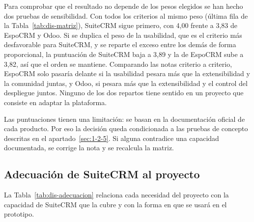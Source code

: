 Para comprobar que el resultado no depende de los pesos elegidos se han hecho dos pruebas de sensibilidad. Con todos los criterios al mismo peso (última fila de la Tabla~\ref{tab:dis-matriz}), SuiteCRM sigue primero, con 4,00 frente a 3,83 de EspoCRM y Odoo. Si se duplica el peso de la usabilidad, que es el criterio más desfavorable para SuiteCRM, y se reparte el exceso entre los demás de forma proporcional, la puntuación de SuiteCRM baja a 3,89 y la de EspoCRM sube a 3,82, así que el orden se mantiene. Comparando las notas criterio a criterio, EspoCRM solo pasaría delante si la usabilidad pesara más que la extensibilidad y la comunidad juntas, y Odoo, si pesara más que la extensibilidad y el control del despliegue juntos. Ninguno de los dos repartos tiene sentido en un proyecto que consiste en adaptar la plataforma.

Las puntuaciones tienen una limitación: se basan en la documentación oficial de cada producto. Por eso la decisión queda condicionada a las pruebas de concepto descritas en el apartado~\ref{sec:1-2-5}. Si alguna contradice una capacidad documentada, se corrige la nota y se recalcula la matriz.

\subsection{Adecuación de SuiteCRM al proyecto}\label{sec:dis-adecuacion}

La Tabla~\ref{tab:dis-adecuacion} relaciona cada necesidad del proyecto con la capacidad de SuiteCRM que la cubre y con la forma en que se usará en el prototipo.

